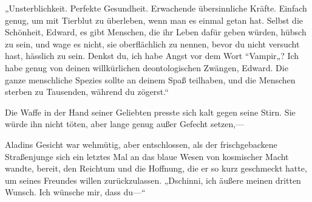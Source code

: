 {%
„Unsterblichkeit. Perfekte Gesundheit. Erwachende übersinnliche Kräfte. Einfach genug, um mit Tierblut zu überleben, wenn man es einmal getan hat. Selbst die Schönheit, Edward, es gibt Menschen, die ihr Leben dafür geben würden, hübsch zu sein, und wage es nicht, sie oberflächlich zu nennen, bevor du nicht versucht hast, hässlich zu sein. Denkst du, ich habe Angst vor dem Wort “Vampir„? Ich habe genug von deinen willkürlichen deontologischen Zwängen, Edward. Die ganze menschliche Spezies sollte an deinem Spaß teilhaben, und die Menschen sterben zu Tausenden, während du zögerst.“

Die Waffe in der Hand seiner Geliebten presste sich kalt gegen seine Stirn. Sie würde ihn nicht töten, aber lange genug außer Gefecht setzen,—


Aladins Gesicht war wehmütig, aber entschlossen, als der frischgebackene Straßenjunge sich ein letztes Mal an das blaue Wesen von kosmischer Macht wandte, bereit, den Reichtum und die Hoffnung, die er so kurz geschmeckt hatte, um seines Freundes willen zurückzulassen. „Dschinni, ich äußere meinen dritten Wunsch. Ich wünsche mir, dass du—“

}

